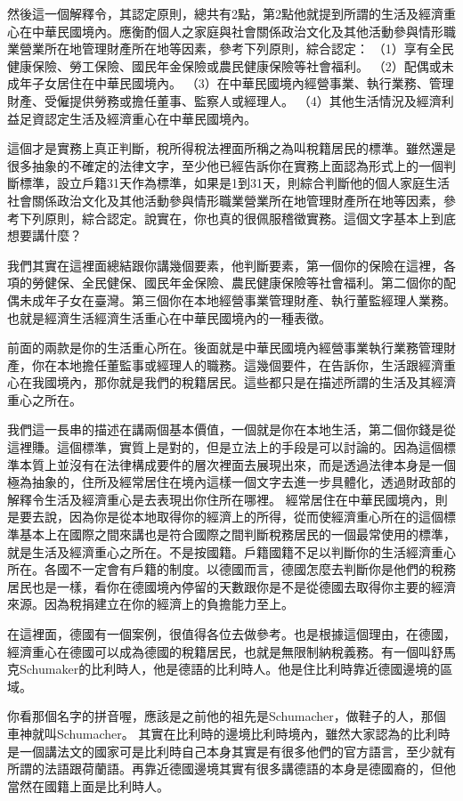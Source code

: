 \documentclass[oneside,sub3section]{ctexbook}
\begin{document}
然後這一個解釋令，其認定原則，總共有2點，第2點他就提到所謂的生活及經濟重心在中華民國境內。應衡酌個人之家庭與社會關係政治文化及其他活動參與情形職業營業所在地管理財產所在地等因素，參考下列原則，綜合認定：
（1）享有全民健康保險、勞工保險、國民年金保險或農民健康保險等社會福利。
（2）配偶或未成年子女居住在中華民國境內。
（3）在中華民國境內經營事業、執行業務、管理財產、受僱提供勞務或擔任董事、監察人或經理人。
（4）其他生活情況及經濟利益足資認定生活及經濟重心在中華民國境內。

這個才是實務上真正判斷，稅所得稅法裡面所稱之為叫稅籍居民的標準。雖然還是很多抽象的不確定的法律文字，至少他已經告訴你在實務上面認為形式上的一個判斷標準，設立戶籍31天作為標準，如果是1到31天，則綜合判斷他的個人家庭生活社會關係政治文化及其他活動參與情形職業營業所在地管理財產所在地等因素，參考下列原則，綜合認定。說實在，你也真的很佩服稽徵實務。這個文字基本上到底想要講什麼？

我們其實在這裡面總結跟你講幾個要素，他判斷要素，第一個你的保險在這裡，各項的勞健保、全民健保、國民年金保險、農民健康保險等社會福利。第二個你的配偶未成年子女在臺灣。第三個你在本地經營事業管理財產、執行董監經理人業務。也就是經濟生活經濟生活重心在中華民國境內的一種表徵。

前面的兩款是你的生活重心所在。後面就是中華民國境內經營事業執行業務管理財產，你在本地擔任董監事或經理人的職務。這幾個要件，在告訴你，生活跟經濟重心在我國境內，那你就是我們的稅籍居民。這些都只是在描述所謂的生活及其經濟重心之所在。

我們這一長串的描述在講兩個基本價值，一個就是你在本地生活，第二個你錢是從這裡賺。這個標準，實質上是對的，但是立法上的手段是可以討論的。因為這個標準本質上並沒有在法律構成要件的層次裡面去展現出來，而是透過法律本身是一個極為抽象的，住所及經常居住在境內這樣一個文字去進一步具體化，透過財政部的解釋令生活及經濟重心是去表現出你住所在哪裡。
經常居住在中華民國境內，則是要去說，因為你是從本地取得你的經濟上的所得，從而使經濟重心所在的這個標準基本上在國際之間來講也是符合國際之間判斷稅務居民的一個最常使用的標準，就是生活及經濟重心之所在。不是按國籍。戶籍國籍不足以判斷你的生活經濟重心所在。各國不一定會有戶籍的制度。以德國而言，德國怎麼去判斷你是他們的稅務居民也是一樣，看你在德國境內停留的天數跟你是不是從德國去取得你主要的經濟來源。因為稅捐建立在你的經濟上的負擔能力至上。

在這裡面，德國有一個案例，很值得各位去做參考。也是根據這個理由，在德國，經濟重心在德國可以成為德國的稅籍居民，也就是無限制納稅義務。有一個叫舒馬克Schumaker的比利時人，他是德語的比利時人。他是住比利時靠近德國邊境的區域。

你看那個名字的拼音喔，應該是之前他的祖先是Schumacher，做鞋子的人，那個車神就叫Schumacher。
其實在比利時的邊境比利時境內，雖然大家認為的比利時是一個講法文的國家可是比利時自己本身其實是有很多他們的官方語言，至少就有所謂的法語跟荷蘭語。再靠近德國邊境其實有很多講德語的本身是德國裔的，但他當然在國籍上面是比利時人。
\end{document}
